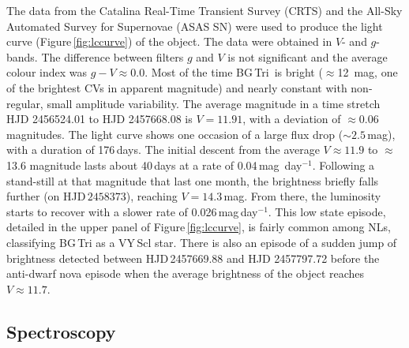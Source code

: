 \documentclass[fleqn,usenatbib]{mnras}
\def\bg{BG\,Tri}
\begin{document}
\begin{figure*}
\setlength{\unitlength}{1mm}
\caption{
 The profiles of important lines in the spectrum of \bg\ from the echelle spectra. The lines are marked in upper corners of each panels. The
 black line is the median of all high-resolution spectra,  whether the low resolution spectrum from Figure\,\ref{fig:lowres} are presented 
 in the background.}
\label{fig:lines}
\end{figure*}

The data from the Catalina Real-Time Transient Survey (CRTS) \citep{2009ApJ...696..870D} and the All-Sky Automated Survey for Supernovae 
(ASAS SN) \citep{2014ApJ...788...48S,2017PASP..129j4502K}  were used to produce the light curve  (Figure\,\ref{fig:lccurve}) of the object.
The data were obtained in $V$- and $g$-bands. The difference between filters $g$ and $V$ is not significant and the average colour index 
was $g-V\approx0.0$.
Most of the time  \bg\ is bright ($\approx$12~mag, one of the brightest CVs in apparent magnitude) and nearly constant with  non-regular, small amplitude variability. The average magnitude in a time stretch HJD 2456524.01 to HJD 2457668.08 is $V=11.91$, with a deviation 
of $\approx$0.06 magnitudes.  The light curve shows one occasion 
of a large flux drop ($\sim2.5$\,mag), with a duration of 176\,days. 
The initial descent from the average $V\approx11.9$ to $\approx$13.6 
magnitude lasts about 40\,days at a rate of 0.04\,mag~day$^{-1}$. 
Following a stand-still at that magnitude that last one month,  the brightness briefly falls further (on HJD\,$2458373$), reaching
$V=14.3$\,mag. From there, the luminosity starts to recover with a slower rate of 0.026\,mag\,day$^{-1}$.
This low state episode,  detailed in the upper panel of Figure\,\ref{fig:lccurve}, is fairly common among NLs, 
classifying BG\,Tri as a VY\,Scl star.
There is also an episode of a sudden jump of brightness detected between HJD\,2457669.88 and HJD 2457797.72 before 
the anti-dwarf nova episode when the average brightness of the object reaches $V\approx11.7$.

\subsection{Spectroscopy}
\end{document}
